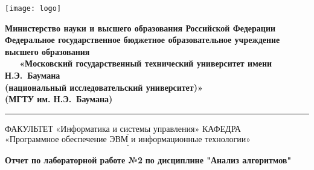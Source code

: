   \thispagestyle{empty}
  \begin{titlepage}
      \noindent \begin{minipage}{0.15\textwidth}
      \texttt{[image: logo]}
      \end{minipage}
      \noindent\begin{minipage}{0.9\textwidth}\centering
          \textbf{Министерство науки и высшего образования Российской Федерации}\\
          \textbf{Федеральное государственное бюджетное образовательное учреждение высшего образования}\\
          \textbf{~~~«Московский государственный технический университет имени Н.Э.~Баумана}\\
          \textbf{(национальный исследовательский университет)»}\\
          \textbf{(МГТУ им. Н.Э.~Баумана)}
      \end{minipage}
      
      \noindent\rule{18cm}{3pt}
      \newline\newline
      \noindent ФАКУЛЬТЕТ $\underline{\text{«Информатика и системы управления»}}$ \newline\newline
      \noindent КАФЕДРА $\underline{\text{«Программное обеспечение ЭВМ и информационные технологии»}}$\newline\newline\newline\newline\newline\newline\newline\newline\newline\newline\newline
      
      
      \begin{center}
          \noindent\begin{minipage}{1.3\textwidth}\centering
              \Large\textbf{  Отчет по лабораторной работе №2}\newline
              \textbf{по дисциплине "Анализ алгоритмов"}\newline\newline
          \end{minipage}
      \end{center}
      

\end{titlepage}
